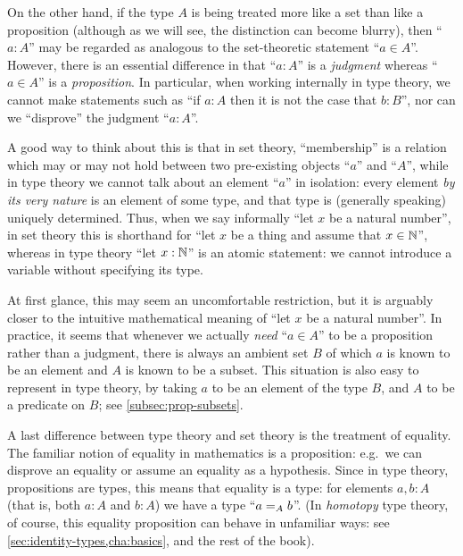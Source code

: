 On the other hand, if the type $A$ is being treated more like a set than like a proposition (although as we will see, the distinction can become blurry), then ``$a:A$'' may be regarded as analogous to the set-theoretic statement ``$a\in A$''.
However, there is an essential difference in that ``$a:A$'' is a \emph{judgment} whereas ``$a\in A$'' is a \emph{proposition}.
In particular, when working internally in type theory, we cannot make statements such as ``if $a:A$ then it is not the case that $b:B$'', nor can we ``disprove'' the judgment ``$a:A$''.

A good way to think about this is that in set theory, ``membership'' is a relation which may or may not hold between two pre-existing objects ``$a$'' and ``$A$'', while in type theory we cannot talk about an element ``$a$'' in isolation: every element \emph{by its very nature} is an element of some type, and that type is (generally speaking) uniquely determined.
Thus, when we say informally ``let $x$ be a natural number'', in set theory this is shorthand for ``let $x$ be a thing and assume that $x\in\nat$'', whereas in type theory ``let $x:\nat$'' is an atomic statement: we cannot introduce a variable without specifying its type.

At first glance, this may seem an uncomfortable restriction, but it is arguably closer to the intuitive mathematical meaning of ``let $x$ be a natural number''.
In practice, it seems that whenever we actually \emph{need} ``$a\in A$'' to be a proposition rather than a judgment, there is always an ambient set $B$ of which $a$ is known to be an element and $A$ is known to be a subset.
This situation is also easy to represent in type theory, by taking $a$ to be an element of the type $B$, and $A$ to be a predicate on $B$; see \autoref{subsec:prop-subsets}.

A last difference between type theory and set theory is the treatment of equality.
The familiar notion of equality in mathematics is a proposition: e.g.\ we can disprove an equality or assume an equality as a hypothesis.
Since in type theory, propositions are types, this means that equality is a type: for elements $a,b:A$ (that is, both $a:A$ and $b:A$) we have a type ``$\id[A]ab$''.
(In \emph{homotopy} type theory, of course, this equality proposition can behave in unfamiliar ways: see \autoref{sec:identity-types,cha:basics}, and the rest of the book).


